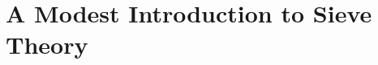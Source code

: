 \documentclass[elemannt.tex]{subfile}
\begin{document}
	\chapter{A Modest Introduction to Sieve Theory}
\end{document}
